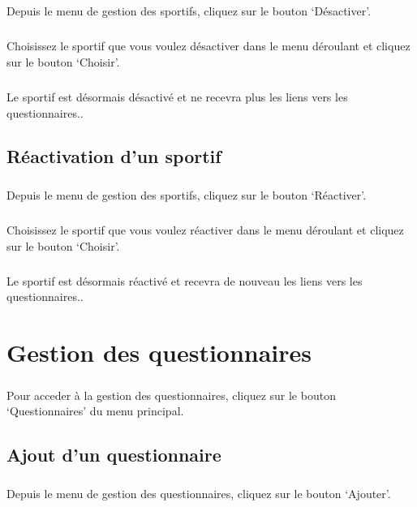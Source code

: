 \documentclass[french,12pt,a4paper,openany]{book}
\begin{document}
			\paragraph{}{Depuis le menu de gestion des sportifs, cliquez sur le bouton `Désactiver'.}
			\paragraph{}{Choisissez le sportif que vous voulez désactiver dans le menu déroulant et cliquez sur le bouton `Choisir'.}
			\paragraph{}{Le sportif est désormais désactivé et ne recevra plus les liens vers les questionnaires.}.
		\section{Réactivation d'un sportif}
			\paragraph{}{Depuis le menu de gestion des sportifs, cliquez sur le bouton `Réactiver'.}
			\paragraph{}{Choisissez le sportif que vous voulez réactiver dans le menu déroulant et cliquez sur le bouton `Choisir'.}
			\paragraph{}{Le sportif est désormais réactivé et recevra de nouveau les liens vers les questionnaires.}.
	\chapter{Gestion des questionnaires}
		\paragraph{}{Pour acceder à la gestion des questionnaires, cliquez sur le bouton `Questionnaires' du menu principal.}
		\section{Ajout d'un questionnaire}
			\paragraph{}{Depuis le menu de gestion des questionnaires, cliquez sur le bouton `Ajouter'.} 
\end{document}
